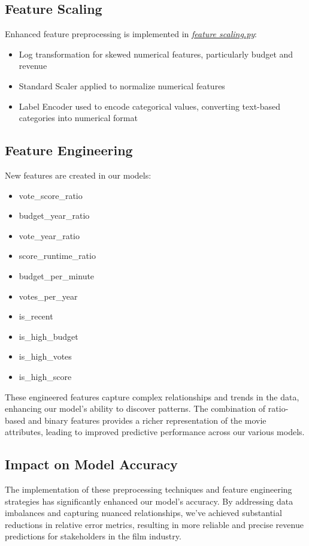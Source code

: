 \documentclass[conference]{IEEEtran}
\begin{document}
    \subsection{Feature Scaling}
        Enhanced feature preprocessing is implemented in \href{https://github.com/Vikranth3140/Movie-Revenue-Prediction/blob/main/models/feature_scaling.py}{\textit{feature scaling.py}}:
        \begin{itemize}
            \item Log transformation for skewed numerical features, particularly budget and revenue
            \item Standard Scaler applied to normalize numerical features
            \item Label Encoder used to encode categorical values, converting text-based categories into numerical format
        \end{itemize}
            
    \subsection{Feature Engineering}
        New features are created in our models:
        \begin{itemize}
            \item vote\_score\_ratio
            \item budget\_year\_ratio
            \item vote\_year\_ratio
            \item score\_runtime\_ratio
            \item budget\_per\_minute
            \item votes\_per\_year
            \item is\_recent
            \item is\_high\_budget
            \item is\_high\_votes
            \item is\_high\_score
        \end{itemize}

        These engineered features capture complex relationships and trends in the data, enhancing our model's ability to discover patterns. The combination of ratio-based and binary features provides a richer representation of the movie attributes, leading to improved predictive performance across our various models.
    \subsection{Impact on Model Accuracy}
        The implementation of these preprocessing techniques and feature engineering strategies has significantly enhanced our model's accuracy. By addressing data imbalances and capturing nuanced relationships, we've achieved substantial reductions in relative error metrics, resulting in more reliable and precise revenue predictions for stakeholders in the film industry.
\end{document}
